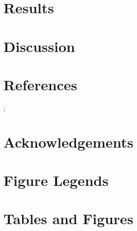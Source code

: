 \documentclass[11pt,letterpaper]{article}
\newcommand{\rotxc}[1]{\begin{sideways}#1\end{sideways}}
\newcommand{\invert}[1]{\rotxc{\rotxc{#1}}}
\begin{document}

%
%

\section{Results}

\section{Discussion}

\section{References}

;

\section{Acknowledgements}

\section{Figure Legends}

\section{Tables and Figures}
\end{document}

